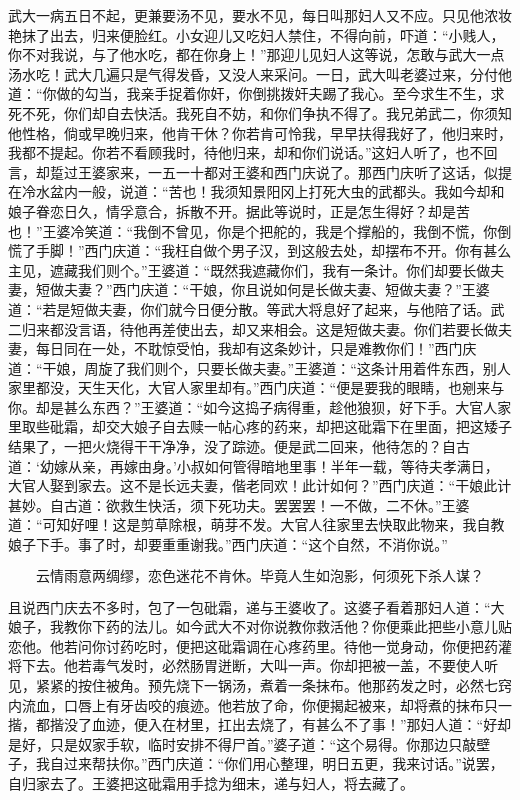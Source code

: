 武大一病五日不起，更兼要汤不见，要水不见，每日叫那妇人又不应。只见他浓妆艳抹了出去，归来便脸红。小女迎儿又吃妇人禁住，不得向前，吓道：“小贱人，你不对我说，与了他水吃，都在你身上！”那迎儿见妇人这等说，怎敢与武大一点汤水吃！武大几遍只是气得发昏，又没人来采问。一日，武大叫老婆过来，分付他道：“你做的勾当，我亲手捉着你奸，你倒挑拨奸夫踢了我心。至今求生不生，求死不死，你们却自去快活。我死自不妨，和你们争执不得了。我兄弟武二，你须知他性格，倘或早晚归来，他肯干休？你若肯可怜我，早早扶得我好了，他归来时，我都不提起。你若不看顾我时，待他归来，却和你们说话。”这妇人听了，也不回言，却踅过王婆家来，一五一十都对王婆和西门庆说了。那西门庆听了这话，似提在冷水盆内一般，说道：“苦也！我须知景阳冈上打死大虫的武都头。我如今却和娘子眷恋日久，情孚意合，拆散不开。据此等说时，正是怎生得好？却是苦也！”王婆冷笑道：“我倒不曾见，你是个把舵的，我是个撑船的，我倒不慌，你倒慌了手脚！”西门庆道：“我枉自做个男子汉，到这般去处，却摆布不开。你有甚么主见，遮藏我们则个。”王婆道：“既然我遮藏你们，我有一条计。你们却要长做夫妻，短做夫妻？”西门庆道：“干娘，你且说如何是长做夫妻、短做夫妻？”王婆道：“若是短做夫妻，你们就今日便分散。等武大将息好了起来，与他陪了话。武二归来都没言语，待他再差使出去，却又来相会。这是短做夫妻。你们若要长做夫妻，每日同在一处，不耽惊受怕，我却有这条妙计，只是难教你们！”西门庆道：“干娘，周旋了我们则个，只要长做夫妻。”王婆道：“这条计用着件东西，别人家里都没，天生天化，大官人家里却有。”西门庆道：“便是要我的眼睛，也剜来与你。却是甚么东西？”王婆道：“如今这捣子病得重，趁他狼狈，好下手。大官人家里取些砒霜，却交大娘子自去赎一帖心疼的药来，却把这砒霜下在里面，把这矮子结果了，一把火烧得干干净净，没了踪迹。便是武二回来，他待怎的？自古道：‘幼嫁从亲，再嫁由身。’小叔如何管得暗地里事！半年一载，等待夫孝满日，大官人娶到家去。这不是长远夫妻，偕老同欢！此计如何？”西门庆道：“干娘此计甚妙。自古道：欲救生快活，须下死功夫。罢罢罢！一不做，二不休。”王婆道：“可知好哩！这是剪草除根，萌芽不发。大官人往家里去快取此物来，我自教娘子下手。事了时，却要重重谢我。”西门庆道：“这个自然，不消你说。”

\[
云情雨意两绸缪，恋色迷花不肯休。
毕竟人生如泡影，何须死下杀人谋？
\]

且说西门庆去不多时，包了一包砒霜，递与王婆收了。这婆子看着那妇人道：“大娘子，我教你下药的法儿。如今武大不对你说教你救活他？你便乘此把些小意儿贴恋他。他若问你讨药吃时，便把这砒霜调在心疼药里。待他一觉身动，你便把药灌将下去。他若毒气发时，必然肠胃迸断，大叫一声。你却把被一盖，不要使人听见，紧紧的按住被角。预先烧下一锅汤，煮着一条抹布。他那药发之时，必然七窍内流血，口唇上有牙齿咬的痕迹。他若放了命，你便揭起被来，却将煮的抹布只一揩，都揩没了血迹，便入在材里，扛出去烧了，有甚么不了事！”那妇人道：“好却是好，只是奴家手软，临时安排不得尸首。”婆子道：“这个易得。你那边只敲壁子，我自过来帮扶你。”西门庆道：“你们用心整理，明日五更，我来讨话。”说罢，自归家去了。王婆把这砒霜用手捻为细末，递与妇人，将去藏了。


